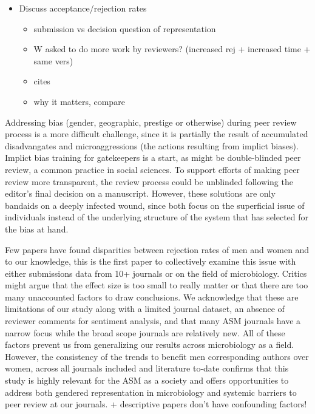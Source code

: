 \documentclass[11pt,]{article}
\providecommand{\tightlist}{%
  \setlength{\itemsep}{0pt}\setlength{\parskip}{0pt}}
\begin{document}
\begin{itemize}
\tightlist
\item
  Discuss acceptance/rejection rates

  \begin{itemize}
  \tightlist
  \item
    submission vs decision question of representation
  \item
    W asked to do more work by reviewers? (increased rej + increased
    time + same vers)
  \item
    cites
  \item
    why it matters, compare
  \end{itemize}
\end{itemize}

Addressing bias (gender, geographic, prestige or otherwise) during peer
review process is a more difficult challenge, since it is partially the
result of accumulated disadvangates and microaggressions (the actions
resulting from implict biases). Implict bias training for gatekeepers is
a start, as might be double-blinded peer review, a common practice in
social sciences. To support efforts of making peer review more
transparent, the review process could be unblinded following the
editor's final decision on a manuscript. However, these solutions are
only bandaids on a deeply infected wound, since both focus on the
superficial issue of individuals instead of the underlying structure of
the system that has selected for the bias at hand.

Few papers have found disparities between rejection rates of men and
women and to our knowledge, this is the first paper to collectively
examine this issue with either submissions data from 10+ journals or on
the field of microbiology. Critics might argue that the effect size is
too small to really matter or that there are too many unaccounted
factors to draw conclusions. We acknowledge that these are limitations
of our study along with a limited journal dataset, an absence of
reviewer comments for sentiment analysis, and that many ASM journals
have a narrow focus while the broad scope journals are relatively new.
All of these factors prevent us from generalizing our results across
microbiology as a field. However, the consistency of the trends to
benefit men corresponding authors over women, across all journals
included and literature to-date confirms that this study is highly
relevant for the ASM as a society and offers opportunities to address
both gendered representation in microbiology and systemic barriers to
peer review at our journals. + descriptive papers don't have confounding
factors!
\end{document}

